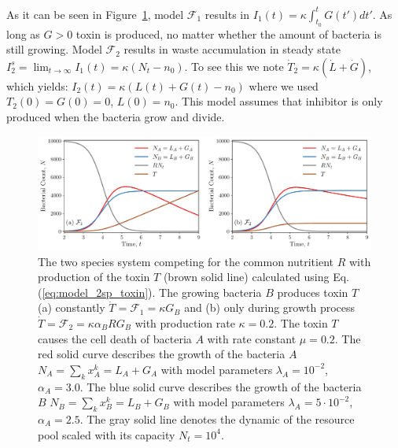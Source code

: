 \documentclass[10pt,A4paper]{article}
\begin{document}
As it can be seen in Figure~\ref{fig:2pool_2sp_toxin}, model $\mathcal{F}_1$ results in $I_1(t)=\kappa\int_{t_0}^tG(t')dt'$. 
As long as $G>0$ toxin is produced, no matter whether the amount of bacteria is still growing. 
Model $\mathcal{F}_2$ results in waste accumulation in steady state $I_2^s=\lim_{t\to\infty}I_1(t)=\kappa(N_t-n_0)$. 
To see this we note $\dot{T}_2=\kappa(\dot{L}+\dot{G})$, which yields: $I_2(t)=\kappa(L(t)+G(t)-n_0)$ where we used $T_2(0)=G(0)=0$, $L(0)=n_0$. 
This model assumes that inhibitor is only produced when the bacteria grow and divide.\\

\begin{figure}[H]
    \begin{center}
    \includegraphics[width=1.\textwidth]{Figures/pool_model_2pools_toxin.pdf}
    \caption{{\footnotesize The two species system competing for the common nutritient $R$ with production of the toxin $T$ (brown solid line) calculated using Eq. (\ref{eq:model_2sp_toxin}).
    The growing bacteria $B$ produces toxin $T$ (a) constantly $\dot{T} = \mathcal{F}_1 = \kappa G_B$ and (b) only during growth process $\dot{T} = \mathcal{F}_2 = \kappa \alpha_B R G_B$ with 
    production rate $\kappa=0.2$.
    The toxin $T$ causes the cell death of bacteria $A$ with rate constant $\mu = 0.2$.
    The red solid curve describes the growth of the bacteria $A$ $N_A = \sum_{k} x_A^k = L_A+G_A$ with model parameters $\lambda_A=10^{-2}$, $\alpha_A=3.0$.
    The blue solid curve describes the growth of the bacteria $B$ $N_B = \sum_{k} x_B^k = L_B+G_B$ with model parameters $\lambda_A=5\cdot 10^{-2}$, $\alpha_A=2.5$.
    The gray solid line denotes the dynamic of the resource pool scaled with its capacity $N_t=10^4$.}}
    \label{fig:2pool_2sp_toxin}
    \end{center}
\end{figure}
\end{document}

